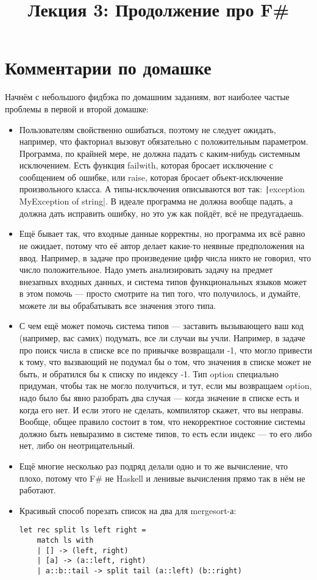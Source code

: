 \documentclass[a5paper]{article}
\title{Лекция 3: Продолжение про F\#}
\date{}
\begin{document}
\maketitle
\thispagestyle{empty}

\section*{Комментарии по домашке}

Начнём с небольшого фидбэка по домашним заданиям, вот наиболее частые проблемы в первой и второй домашке:

\begin{itemize}
    \item Пользователям свойственно ошибаться, поэтому не следует ожидать, например, что факториал вызовут обязательно с положительным параметром. Программа, по крайней мере, не должна падать с каким-нибудь системным исключением. Есть функция failwith, которая бросает исключение с сообщением об ошибке, или raise, которая бросает объект-исключение произвольного класса. А типы-исключения описываются вот так: \texttt|exception MyException of string|. В идеале программа не должна вообще падать, а должна дать исправить ошибку, но это уж как пойдёт, всё не предугадаешь.
    \item Ещё бывает так, что входные данные корректны, но программа их всё равно не ожидает, потому что её автор делает какие-то неявные предположения на ввод. Например, в задаче про произведение цифр числа никто не говорил, что число положительное. Надо уметь анализировать задачу на предмет внезапных входных данных, и система типов функциональных языков может в этом помочь --- просто смотрите на тип того, что получилось, и думайте, можете ли вы обрабатывать все значения этого типа.
    \item С чем ещё может помочь система типов --- заставить вызывающего ваш код (например, вас самих) подумать, все ли случаи вы учли. Например, в задаче про поиск числа в списке все по привычке возвращали -1, что могло привести к тому, что вызвающий не подумал бы о том, что значения в списке может не быть, и обратился бы к списку по индексу -1. Тип option специально придуман, чтобы так не могло получиться, и тут, если мы возвращаем option, надо было бы явно разобрать два случая --- когда значение в списке есть и когда его нет. И если этого не сделать, компилятор скажет, что вы неправы. Вообще, общее правило состоит в том, что некорректное состояние системы должно быть невыразимо в системе типов, то есть если индекс --- то его либо нет, либо он неотрицательный.
    \item Ещё многие несколько раз подряд делали одно и то же вычисление, что плохо, потому что F\# не Haskell и ленивые вычисления прямо так в нём не работают.
    \item Красивый способ порезать список на два для mergesort-а:
        \begin{verbatim}
let rec split ls left right =
    match ls with
    | [] -> (left, right)
    | [a] -> (a::left, right)
    | a::b::tail -> split tail (a::left) (b::right)
        \end{verbatim}
\end{itemize}
\end{document}
